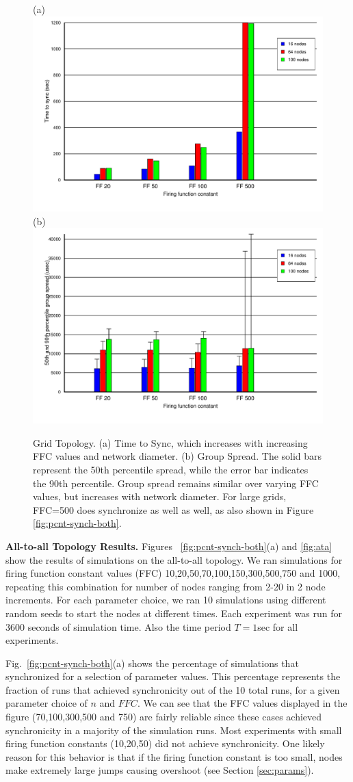 \documentclass{sig-alternate}
\begin{document}
{%
\begin{figure}
\begin{center}
(a)
\includegraphics[width=0.4\hsize]{./figures/mdw/grid/tts.pdf}
(b)
\includegraphics[width=0.4\hsize]{./figures/mdw/grid/gs-grid.pdf}
\end{center}
\caption{Grid Topology. (a) Time to Sync, which increases with
increasing FFC values and network diameter. (b) Group Spread. The solid
bars represent the 50th percentile spread, while the error bar
indicates the 90th percentile. Group spread remains similar over
varying FFC values, but increases with network diameter. For large
grids, FFC=500 does synchronize as well as well, as also shown in
Figure \ref{fig:pcnt-synch-both}.}
\label{fig:grid}
\end{figure}

{\bf All-to-all Topology Results.}  Figures
~\ref{fig:pcnt-synch-both}(a) and \ref{fig:ata} show the results of
simulations on the all-to-all topology. We ran simulations for firing
function constant values (FFC) 10,20,50,70,100,150,300,500,750 and
1000, repeating this combination for number of nodes ranging from 2-20
in 2 node increments. For each parameter choice, we ran 10 simulations
using different random seeds to start the nodes at different
times. Each experiment was run for 3600 seconds of simulation
time. Also the time period $T=1$sec for all experiments.

Fig.~\ref{fig:pcnt-synch-both}(a) shows the percentage of simulations
that synchronized for a selection of parameter values. This percentage
represents the fraction of runs that achieved synchronicity out of the
10 total runs, for a given parameter choice of $n$ and $FFC$.  We can
see that the FFC values displayed in the figure (70,100,300,500 and
750) are fairly reliable since these cases achieved synchronicity in a
majority of the simulation runs.  Most experiments with small firing
function constants (10,20,50) did not achieve synchronicity. One
likely reason for this behavior is that if the firing function
constant is too small, nodes make extremely large jumps causing
overshoot (see Section \ref{sec:params}).

}
\end{document}
